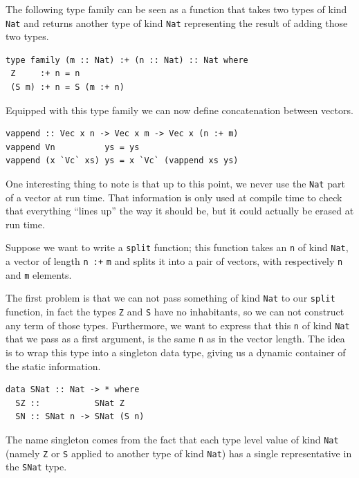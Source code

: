 \documentclass[11pt, titlepage]{article}
\begin{document}
The following type family can be seen as a function that takes two types of kind \texttt{Nat} and returns another type of kind \texttt{Nat} representing the result of adding those two types.

\begin{verbatim}
type family (m :: Nat) :+ (n :: Nat) :: Nat where
 Z     :+ n = n
 (S m) :+ n = S (m :+ n)
\end{verbatim}

Equipped with this type family we can now define concatenation between
vectors.

\begin{verbatim}
vappend :: Vec x n -> Vec x m -> Vec x (n :+ m)
vappend Vn          ys = ys
vappend (x `Vc` xs) ys = x `Vc` (vappend xs ys)
\end{verbatim}

One interesting thing to note is that up to this point, we never use the
\texttt{Nat} part of a vector at run time. That information is only used
at compile time to check that everything ``lines up'' the way it should
be, but it could actually be erased at run time.

Suppose we want to write a \texttt{split} function; this function takes
an \texttt{n} of kind \texttt{Nat}, a vector of length \texttt{n :+} \texttt{m}
and splits it into a pair of vectors, with respectively \texttt{n} and
\texttt{m} elements.

The first problem is that we can not pass something of kind
\texttt{Nat} to our \texttt{split} function, in fact the types \texttt{Z} and \texttt{S} have no inhabitants, so we can not construct any term of those types. Furthermore, we want to
express that this \texttt{n} of kind \texttt{Nat} that we pass as a first argument, is the same \texttt{n} as in the vector length. The idea is to 
wrap this type into a singleton data type, giving us a dynamic container of the static 
information.

\begin{verbatim}
data SNat :: Nat -> * where
  SZ ::           SNat Z
  SN :: SNat n -> SNat (S n)
\end{verbatim}

The name singleton comes from the fact that each type level value of
kind \texttt{Nat} (namely \texttt{Z} or \texttt{S} applied to another
type of kind \texttt{Nat}) has a single representative in the
\texttt{SNat} type.
\end{document}
